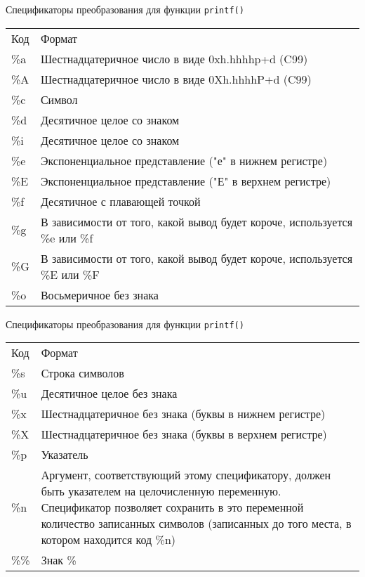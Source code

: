 \documentclass[xcolor=table]{beamer}
\begin{document}
\begin{frame}{Спецификаторы преобразования для функции \texttt{printf()}}
    \newline
    {
    \begin{tabular}{m{1cm}|m{10cm}}
        \rowcolor{red!60!}
        Код & Формат \\
        \%a & Шестнадцатеричное число в виде 0xh.hhhhp+d (C99) \\
        \%A & Шестнадцатеричное число в виде 0Xh.hhhhP+d (C99) \\
        \%c & Символ \\
        \%d & Десятичное целое со знаком \\
        \%i & Десятичное целое со знаком \\
        \%e & Экспоненциальное представление ("е" в нижнем регистре) \\
        \%E & Экспоненциальное представление ("Е" в верхнем регистре) \\
        \%f & Десятичное с плавающей точкой \\
        \%g & В зависимости от того, какой вывод будет короче, используется \%e или \%f \\
        \%G & В зависимости от того, какой вывод будет короче, используется \%E или \%F \\
        \%o & Восьмеричное без знака \\
    \end{tabular}
    }
\end{frame}

\begin{frame}{Спецификаторы преобразования для функции \texttt{printf()}}
    \newline
    {
    \begin{tabular}{m{1cm}|m{10cm}}
        \rowcolor{red!60!}
        Код & Формат \\
        \%s & Строка символов \\
        \%u & Десятичное целое без знака\\
        \%x & Шестнадцатеричное без знака (буквы в нижнем регистре) \\
        \%X & Шестнадцатеричное без знака (буквы в верхнем регистре) \\
        \%p & Указатель \\
        \%n & Аргумент, соответствующий этому спецификатору, должен быть указателем на целочисленную переменную. Спецификатор позволяет сохранить в это переменной количество записанных символов (записанных до того места, в котором находится код \%n) \\
        \%\% & Знак \% \\
    \end{tabular}
    }
\end{frame}
\end{document}
